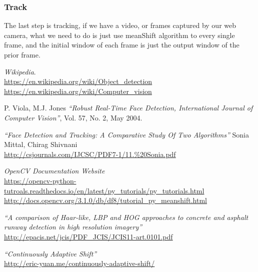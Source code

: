 \documentclass[a4paper,12pt]{report}
\begin{document}
    \subsubsection{Track}

    The last step is tracking, if we have a video, or frames captured by our web camera, what we need to do is just use meanShift algorithm to every single frame, and the initial window of each frame is just the output window of the prior frame.
  
  
  
  
  

\begin{thebibliography}{9}
    \textit{Wikipedia}.\\
    \url{https://en.wikipedia.org/wiki/Object_detection} \\
    \url{https://en.wikipedia.org/wiki/Computer_vision}
    
    P. Viola,  M.J. Jones
    \textit{``Robust  Real-Time  Face  Detection,  International Journal  of  Computer Vision''}, Vol.  57, No. 2, May 2004.
    
    \textit{``Face Detection and Tracking: A Comparative Study Of Two Algorithms''}
    Sonia Mittal, Chirag Shivnani\\
    \url{http://csjournals.com/IJCSC/PDF7-1/11.\%20Sonia.pdf}
    
    \textit{OpenCV Documentation Website} \\
    \url{https://opencv-python-tutroals.readthedocs.io/en/latest/py_tutorials/py_tutorials.html}\\
    \url{http://docs.opencv.org/3.1.0/db/df8/tutorial_py_meanshift.html}
    
    
    \textit{``A comparison of Haar-like, LBP and HOG approaches to concrete and asphalt
runway detection in high resolution imagery''} \\
    \url{http://epacis.net/jcis/PDF_JCIS/JCIS11-art.0101.pdf}
    
    \textit{``Continuously Adaptive Shift''} \\
    \url{http://eric-yuan.me/continuously-adaptive-shift/}
    


\end{thebibliography}
\end{document}
